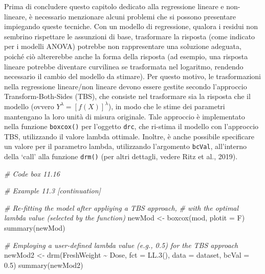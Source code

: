 \documentclass[
  12pt,
]{book}
\newenvironment{Shaded}{\begin{snugshade}}{\end{snugshade}}
\newcommand{\AttributeTok}[1]{\textcolor[rgb]{0.77,0.63,0.00}{#1}}
\newcommand{\CommentTok}[1]{\textcolor[rgb]{0.56,0.35,0.01}{\textit{#1}}}
\newcommand{\FloatTok}[1]{\textcolor[rgb]{0.00,0.00,0.81}{#1}}
\newcommand{\FunctionTok}[1]{\textcolor[rgb]{0.00,0.00,0.00}{#1}}
\newcommand{\NormalTok}[1]{#1}
\newcommand{\OtherTok}[1]{\textcolor[rgb]{0.56,0.35,0.01}{#1}}
\newcommand{\SpecialCharTok}[1]{\textcolor[rgb]{0.00,0.00,0.00}{#1}}
\begin{document}
Prima di concludere questo capitolo dedicato alla regressione lineare e non-lineare, è necessario menzionare alcuni problemi che si possono presentare impiegando queste tecniche. Con un modello di regressione, qualora i residui non sembrino rispettare le assunzioni di base, trasformare la risposta (come indicato per i modelli ANOVA) potrebbe non rappresentare una soluzione adeguata, poiché ciò altererebbe anche la forma della risposta (ad esempio, una risposta lineare potrebbe diventare curvilinea se trasformata nel logaritmo, rendendo necessario il cambio del modello da stimare). Per questo motivo, le trasformazioni nella regressione lineare/non lineare devono essere gestite secondo l'approccio Transform-Both-Sides (TBS), che consiste nel trasformare sia la risposta che il modello (ovvero \(Y^{\lambda} = \left[f(X)\right]^{\lambda}\)), in modo che le stime dei parametri mantengano la loro unità di misura originale. Tale approccio è implementato nella funzione \texttt{boxcox()} per l'oggetto \texttt{drc}, che ri-stima il modello con l'approccio TBS, utilizzando il valore lambda ottimale. Inoltre, è anche possibile specificare un valore per il parametro lambda, utilizzando l'argomento \texttt{bcVal}, all'interno della `call' alla funzione \texttt{drm()} (per altri dettagli, vedere Ritz et al., 2019).

\begin{Shaded}
\begin{Highlighting}[]
\CommentTok{\# Code box 11.16}

\CommentTok{\# Example 11.3 [continuation]}

\CommentTok{\# Re{-}fitting the model after appliying a TBS approach, }
\CommentTok{\# with the optimal lambda value (selected by the function)}
\NormalTok{newMod }\OtherTok{\textless{}{-}} \FunctionTok{boxcox}\NormalTok{(mod, }\AttributeTok{plotit =}\NormalTok{ F)}
\FunctionTok{summary}\NormalTok{(newMod)}

\CommentTok{\# Employing a user{-}defined lambda value (e.g., 0.5) for the TBS approach}
\NormalTok{newMod2 }\OtherTok{\textless{}{-}} \FunctionTok{drm}\NormalTok{(FreshWeight }\SpecialCharTok{\textasciitilde{}}\NormalTok{ Dose, }\AttributeTok{fct =} \FunctionTok{LL.3}\NormalTok{(),}
           \AttributeTok{data =}\NormalTok{ dataset, }\AttributeTok{bcVal =} \FloatTok{0.5}\NormalTok{)}
\FunctionTok{summary}\NormalTok{(newMod2)}
\end{Highlighting}
\end{Shaded}
\end{document}
